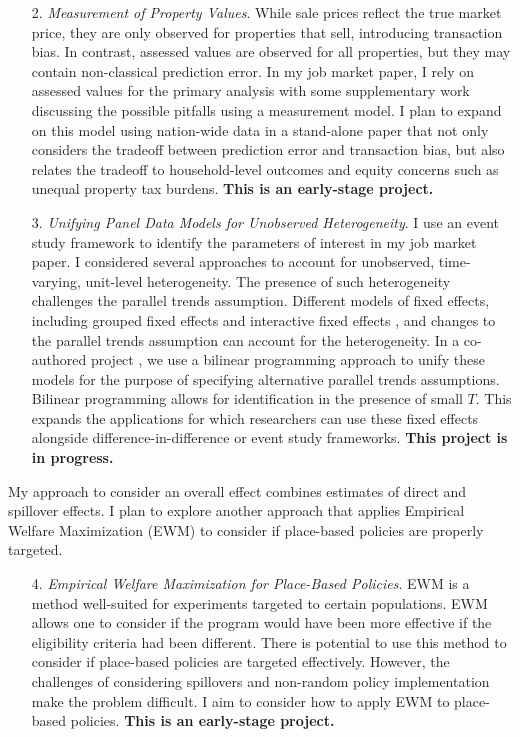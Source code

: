 \begin{enumerate}
\item[2.] \textit{Measurement of Property Values}. While sale prices reflect the true market price, they are only observed for properties that sell, introducing transaction bias. In contrast, assessed values are observed for all properties, but they may contain non-classical prediction error. In my job market paper, I rely on assessed values for the primary analysis with some supplementary work discussing the possible pitfalls using a measurement model. I plan to expand on this model using nation-wide data in a stand-alone paper that not only considers the tradeoff between prediction error and transaction bias, but also relates the tradeoff to household-level outcomes and equity concerns such as unequal property tax burdens. \textbf{This is an early-stage project.}

\item[3.] \textit{Unifying Panel Data Models for Unobserved Heterogeneity}. I use an event study framework to identify the parameters of interest in my job market paper. I considered several approaches to account for unobserved, time-varying, unit-level heterogeneity. The presence of such heterogeneity challenges the parallel trends assumption. Different models of fixed effects, including grouped fixed effects and interactive fixed effects \citep{bai_panel_2009,bonhomme_grouped_2015}, and changes to the parallel trends assumption can account for the heterogeneity. In a co-authored project \citep{shea_unifying_2023}, we use a bilinear programming approach to unify these models for the purpose of specifying alternative parallel trends assumptions. Bilinear programming allows for identification in the presence of small $T$. This expands the applications for which researchers can use these fixed effects alongside difference-in-difference or event study frameworks. \textbf{This project is in progress.}
\end{enumerate} 

My approach to consider an overall effect combines estimates of direct and spillover effects. I plan to explore another approach that applies Empirical Welfare Maximization (EWM) to consider if place-based policies are properly targeted.

\begin{enumerate}
\item[4.] \textit{Empirical Welfare Maximization for Place-Based Policies}. EWM \citep{kitagawa_who_2018} is a method well-suited for experiments targeted to certain populations. EWM allows one to consider if the program would have been more effective if the eligibility criteria had been different. There is potential to use this method to consider if place-based policies are targeted effectively. However, the challenges of considering spillovers and non-random policy implementation make the problem difficult. I aim to consider how to apply EWM to place-based policies. \textbf{This is an early-stage project.}
\end{enumerate}

